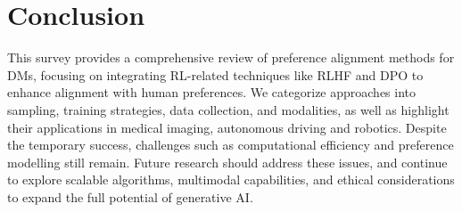 \section{Conclusion}

This survey provides a comprehensive review of preference alignment methods for DMs, focusing on integrating RL-related techniques like RLHF and DPO to enhance alignment with human preferences. We categorize approaches into sampling, training strategies, data collection, and modalities, as well as highlight their applications in medical imaging, autonomous driving and robotics. Despite the temporary success, challenges such as computational efficiency and preference modelling still remain. Future research should address these issues, and continue to explore scalable algorithms, multimodal capabilities, and ethical considerations to expand the full potential of generative AI.